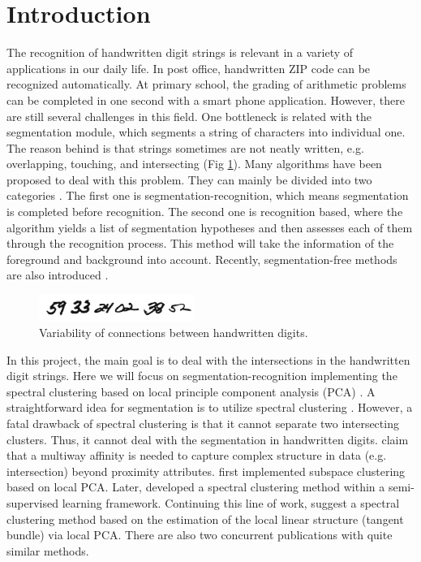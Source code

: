 \documentclass[11pt, oneside]{article}   	%
\begin{document}
\section{Introduction}

The recognition of handwritten digit strings is relevant in a variety of applications in our daily life. In post office, handwritten ZIP code can be recognized automatically. At primary school, the grading of arithmetic problems can be completed in one second with a smart phone application. However, there are still several challenges in this field. One bottleneck is related with the segmentation module, which segments a string of characters into individual one. The reason behind is that strings sometimes are not neatly written, e.g. overlapping, touching, and intersecting (Fig \ref{example}). Many algorithms have been proposed to deal with this problem. They can mainly be divided into two categories \citep{casey1996}. The first one is segmentation-recognition, which means segmentation is completed before recognition. The second one is recognition based, where the algorithm yields a list of segmentation hypotheses and then assesses each of them through the recognition process. This method will take the information of the foreground and background into account. Recently, segmentation-free methods are also introduced \citep{hochuli2018}.

\begin{figure}[h] %
   \centering
   \includegraphics[width=2in]{example.png} 
   \caption{Variability of connections between handwritten digits.}
   \label{example}
\end{figure}

In this project, the main goal is to deal with the intersections in the handwritten digit strings. Here we will focus on segmentation-recognition implementing the spectral clustering based on local principle component analysis (PCA) \citep{arias2017}. A straightforward idea for segmentation is to utilize spectral clustering \citep{ng2002}. However, a fatal drawback of spectral clustering is that it cannot separate two intersecting clusters. Thus, it cannot deal with the segmentation in handwritten digits. \citet{shashua2006} claim that a multiway affinity is needed to capture complex structure in data (e.g. intersection) beyond proximity attributes. \citet{fan2006} first implemented subspace clustering based on local PCA. Later, \citet{goldberg2009} developed a spectral clustering method within a semi-supervised learning framework. Continuing this line of work, \citep{arias2011} suggest a spectral clustering method based on the estimation of the local linear structure (tangent bundle) via local PCA. There are also two concurrent publications \citep{wang2011, gong2012} with quite similar methods.
\end{document}
